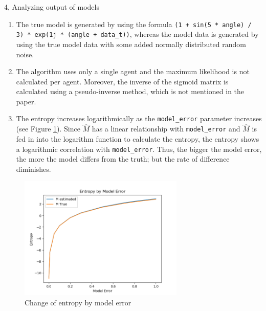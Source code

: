 \documentclass[10pt,a4paper]{article}
\begin{document}
\begin{task}{4, Analyzing output of models}

\begin{enumerate}
    \item The true model is generated by using the formula \texttt{(1 + sin(5 * angle) / 3) * exp(1j * (angle + data\_t))}, whereas the model data is generated by using the true model data with some added normally distributed random noise.
    \item The algorithm uses only a single agent and the maximum likelihood is not calculated per agent. Moreover, the inverse of the sigmoid matrix is calculated using a pseudo-inverse method, which is not mentioned in the paper.
    \item The entropy increases logarithmically as the \texttt{model\_error} parameter increases (see Figure \ref{fig:entropy_change_task4}). Since $\hat{M}$ has a linear relationship with \texttt{model\_error} and $\hat{M}$ is fed in into the logarithm function to calculate the entropy, the entropy shows a logarithmic correlation with \texttt{model\_error}. Thus, the bigger the model error, the more the model differs from the truth; but the rate of difference diminishes.
\end{enumerate}
 

\begin{figure}[H]
    \centering
    \includegraphics[width=0.7\textwidth]{pictures/task4/task4_entropy.png}
    \caption{Change of entropy by model error}
    \label{fig:entropy_change_task4}
\end{figure}

\end{task}
\end{document}
